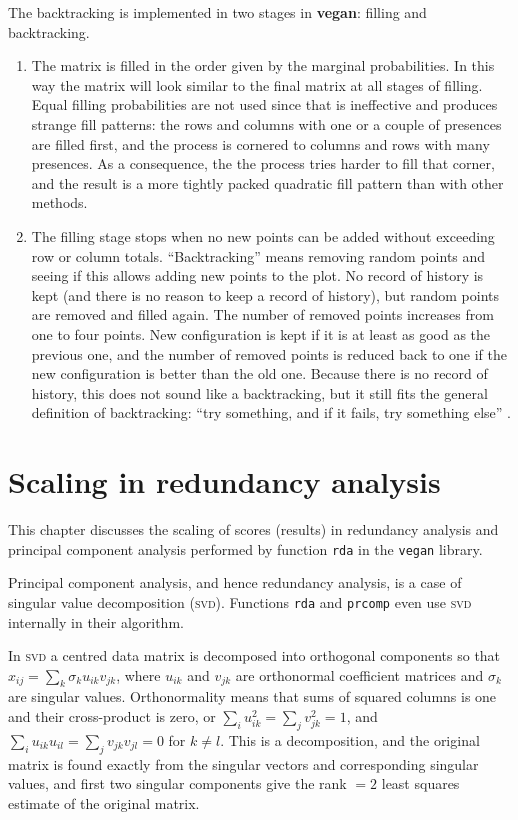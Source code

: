 \documentclass[a4paper,10pt]{amsart}
\begin{document}
The backtracking is implemented in two stages in \textbf{vegan}: filling and
backtracking.
\begin{enumerate}
  \item The matrix is filled in the order given by the marginal
    probabilities. In this way the matrix will look similar to the
    final matrix at all stages of filling. Equal filling probabilities
    are not used since that is ineffective and produces strange fill
    patterns: the rows and columns with one or a couple of presences
    are filled first, and the process is cornered to columns and
    rows with many presences. As a consequence, the the process tries
    harder to fill that corner, and the result is a more tightly
    packed quadratic fill pattern than with other methods.
  \item The filling stage stops when no new points can be added
    without exceeding row or column totals. ``Backtracking'' means
    removing random points and seeing if this allows adding new points
    to the plot. No record of history is kept (and there is no reason
    to keep a record of history), but random points are removed and
    filled again. The number of removed points increases from one to
    four points. New configuration is kept if it is at least as good
    as the previous one, and the number of removed points is reduced
    back to one if the new configuration is better than the old one.
    Because there is no record of history, this does not sound like a
    backtracking, but it still fits the general definition of
    backtracking: ``try something, and if it fails, try something
    else'' \cite{Sedgewick90}.
\end{enumerate}


\section{Scaling in redundancy analysis}

This chapter discusses the scaling of scores (results) in redundancy
analysis and principal component analysis performed by function
\texttt{rda} in the \texttt{vegan} library.  

Principal component analysis, and hence redundancy analysis, is a case
of singular value decomposition (\textsc{svd}).  Functions
\texttt{rda} and \texttt{prcomp} even use \textsc{svd} internally in
their algorithm.

In \textsc{svd} a centred data matrix is decomposed into orthogonal
components so that $x_{ij} = \sum_k \sigma_k u_{ik} v_{jk}$, where
$u_{ik}$ and $v_{jk}$ are orthonormal coefficient matrices and
$\sigma_k$ are singular values.  Orthonormality means that sums of
squared columns is one and their cross-product is zero, or $\sum_i
u_{ik}^2 = \sum_j v_{jk}^2 = 1$, and $\sum_i u_{ik} u_{il} = \sum_j
v_{jk} v_{jl} = 0$ for $k \neq l$. This is a decomposition, and the
original matrix is found exactly from the singular vectors and
corresponding singular values, and first two singular components give
the rank $=2$ least squares estimate of the original matrix.
\end{document}
